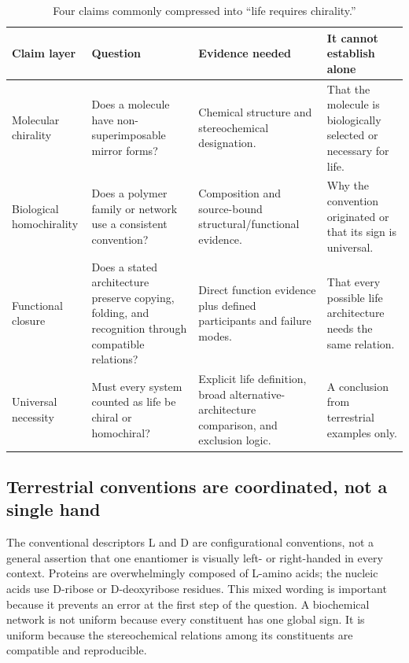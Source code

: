 \documentclass[conference]{IEEEtran}
\begin{document}
\begin{table}[!t]
\caption{Four claims commonly compressed into ``life requires chirality.''}
\label{tab:claims}
\centering
\renewcommand{\arraystretch}{1.20}
\begin{tabular}{|P{0.19\textwidth}|P{0.26\textwidth}|P{0.27\textwidth}|P{0.17\textwidth}|}
\hline
\textbf{Claim layer} & \textbf{Question} & \textbf{Evidence needed} & \textbf{It cannot establish alone} \\
\hline
Molecular chirality & Does a molecule have non-superimposable mirror forms? & Chemical structure and stereochemical designation. & That the molecule is biologically selected or necessary for life. \\
\hline
Biological homochirality & Does a polymer family or network use a consistent convention? & Composition and source-bound structural/functional evidence. & Why the convention originated or that its sign is universal. \\
\hline
Functional closure & Does a stated architecture preserve copying, folding, and recognition through compatible relations? & Direct function evidence plus defined participants and failure modes. & That every possible life architecture needs the same relation. \\
\hline
Universal necessity & Must every system counted as life be chiral or homochiral? & Explicit life definition, broad alternative-architecture comparison, and exclusion logic. & A conclusion from terrestrial examples only. \\
\hline
\end{tabular}
\end{table}

\subsection{Terrestrial conventions are coordinated, not a single hand}

The conventional descriptors L and D are configurational conventions, not a general assertion that one enantiomer is visually left- or right-handed in every context. Proteins are overwhelmingly composed of L-amino acids; the nucleic acids use D-ribose or D-deoxyribose residues. This mixed wording is important because it prevents an error at the first step of the question. A biochemical network is not uniform because every constituent has one global sign. It is uniform because the stereochemical relations among its constituents are compatible and reproducible.
\end{document}
